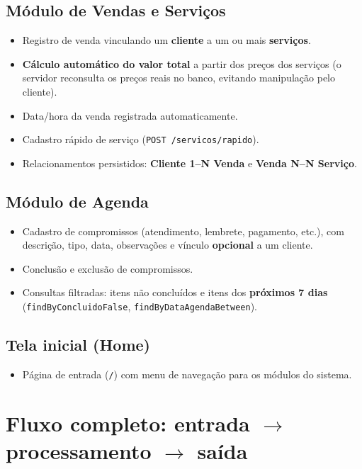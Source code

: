 \documentclass[12pt,a4paper]{article}
\begin{document}
\subsection{Módulo de Vendas e Serviços}
\begin{itemize}[leftmargin=*]
  \item Registro de venda vinculando um \textbf{cliente} a um ou mais \textbf{serviços}.
  \item \textbf{Cálculo automático do valor total} a partir dos preços dos serviços
        (o servidor reconsulta os preços reais no banco, evitando manipulação pelo cliente).
  \item Data/hora da venda registrada automaticamente.
  \item Cadastro rápido de serviço (\texttt{POST /servicos/rapido}).
  \item Relacionamentos persistidos: \textbf{Cliente 1--N Venda} e \textbf{Venda N--N Serviço}.
\end{itemize}

\subsection{Módulo de Agenda}
\begin{itemize}[leftmargin=*]
  \item Cadastro de compromissos (atendimento, lembrete, pagamento, etc.), com descrição,
        tipo, data, observações e vínculo \textbf{opcional} a um cliente.
  \item Conclusão e exclusão de compromissos.
  \item Consultas filtradas: itens não concluídos e itens dos \textbf{próximos 7 dias}
        (\texttt{findByConcluidoFalse}, \texttt{findByDataAgendaBetween}).
\end{itemize}

\subsection{Tela inicial (Home)}
\begin{itemize}[leftmargin=*]
  \item Página de entrada (\texttt{/}) com menu de navegação para os módulos do sistema.
\end{itemize}

\section{Fluxo completo: entrada $\rightarrow$ processamento $\rightarrow$ saída}
\end{document}
